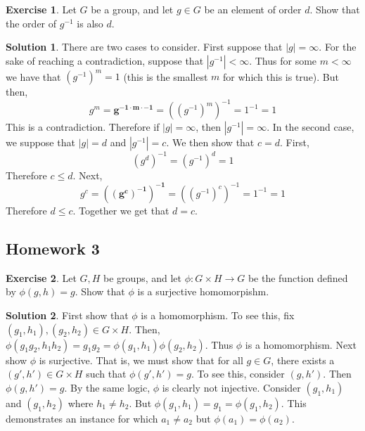 \documentclass[12pt]{article}
\theoremstyle{definition}
\newtheorem{exercise}{Exercise}
\theoremstyle{definition}
\newtheorem{solution}{Solution}
\begin{document}
\begin{exercise}
Let $G$ be a group, and let $g \in G$ be an element of order $d$. Show that the order of $g^{-1}$ is also $d$.
\end{exercise}
\begin{solution}
There are two cases to consider. First suppose that $|g| = \infty$. For the sake of reaching a contradiction, suppose that $|g^{-1}| < \infty$. Thus for some $m < \infty$ we have that $(g^{-1})^m = 1$ (this is the smallest $m$ for which this is true). But then,
\begin{equation}
	g^m = \mathbf{g^{-1 \cdot m \cdot -1}} = ((g^{-1})^m)^{-1} = 1^{-1} = 1
\end{equation}
This is a contradiction. Therefore if $|g| = \infty$, then $|g^{-1}| = \infty$. In the second case, we suppose that $|g| = d$ and $|g^{-1}| = c$. We then show that $c=d$. First,
\begin{equation}
	(g^d)^{-1} = (g^{-1})^d = 1
\end{equation}
Therefore $c \leq d$. Next, 
\begin{equation}
	g^c = \mathbf{((g^c)^{-1})^{-1}} = ((g^{-1})^c)^{-1} = 1^{-1} = 1
\end{equation}
Therefore $d \leq c$. Together we get that $d = c$.
\end{solution}

\subsection{Homework 3}
\begin{exercise}
Let $G, H$ be groups, and let $\phi: G \times H \to G$ be the function defined by $\phi(g,h) = g$. Show that $\phi$ is a surjective homomorpishm. 
\end{exercise}
\begin{solution}
First show that $\phi$ is a homomorphism. To see this, fix $(g_1, h_1), (g_2, h_2) \in G \times H$. Then,
$\phi(g_1g_2, h_1h_2) = g_1 g_2 = \phi(g_1,h_1) \phi(g_2,h_2)$. Thus $\phi$ is a homomorphism. Next show $\phi$ is surjective. That is, we must show that for all $g \in G$, there exists a $(g', h') \in G \times H$ such that $\phi(g',h') = g$. To see this, consider $(g,h')$. Then $\phi(g,h') = g$. By the same logic, $\phi$ is clearly not injective. Consider $(g_1, h_1)$ and $(g_1, h_2)$ where $h_1 \neq h_2$. But $\phi(g_1,h_1) = g_1 = \phi(g_1, h_2)$. This demonstrates an instance for which $a_1 \neq a_2$ but $\phi(a_1) = \phi(a_2)$. 
\end{solution}
\end{document}
